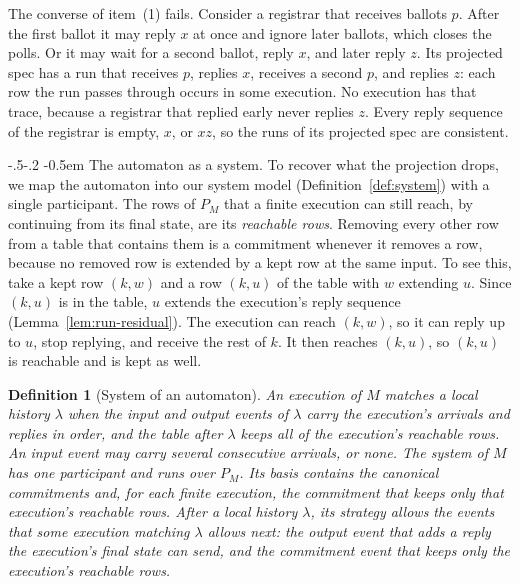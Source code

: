\documentclass[sigconf]{cidr-2027}
\makeatletter
\newtheorem{definition}{Definition}
\theoremstyle{remark}
\renewcommand\paragraph{\@startsection{paragraph}{4}{\z@}%
  {-.5\baselineskip \@plus -2\p@ \@minus -.2\p@}%
  {-0.5em}%
  {\normalfont\bfseries}}
\newcommand{\commitment}{commitment\xspace}
\newcommand{\commitments}{commitments\xspace}
\newcommand{\outrelpast}{extended\xspace}     %
\makeatother
\begin{document}
The converse of item~(1) fails. Consider a registrar that receives ballots
$p$. After the first ballot it may reply $x$ at once and ignore later
ballots, which closes the polls. Or it may wait for a second ballot, reply
$x$, and later reply $z$. Its projected spec has a run that receives $p$,
replies $x$, receives a second $p$, and replies $z$: each row the run passes
through occurs in some execution. No execution has that trace, because a
registrar that replied early never replies $z$. Every reply sequence of the
registrar is empty, $x$, or $xz$, so the runs of its projected spec are
consistent.

\paragraph{The automaton as a system.}
To recover what the projection drops, we map the automaton into our system
model (Definition~\ref{def:system}) with a single participant. The rows of
$P_M$ that a finite execution can still reach, by continuing from its final
state, are its \emph{reachable rows}. Removing every other row from a table
that contains them is a \commitment whenever it removes a row, because no
removed row is \outrelpast by a kept row at the same input. To see this, take
a kept row $(k,w)$ and a row $(k,u)$ of the table with $w$ extending $u$. Since $(k,u)$ is in the table, $u$ extends the execution's reply sequence
(Lemma~\ref{lem:run-residual}). The execution can reach $(k,w)$, so it can
reply up to $u$, stop replying, and receive the rest of $k$. It then reaches
$(k,u)$, so $(k,u)$ is reachable and is kept as well.

\begin{definition}[System of an automaton]
\label{def:automaton-system}
An execution of $M$ \emph{matches} a local history $\lambda$ when the input
and output events of $\lambda$ carry the execution's arrivals and replies in
order, and the table after $\lambda$ keeps all of the execution's reachable
rows. An input event may carry several consecutive arrivals, or none. The
\emph{system of} $M$ has one participant and runs over $P_M$. Its basis
contains the canonical \commitments and, for each finite execution, the
\commitment that keeps only that execution's reachable rows. After a local
history $\lambda$, its strategy allows the events that some execution matching
$\lambda$ allows next: the output event that adds a reply the execution's
final state can send, and the \commitment event that keeps only the
execution's reachable rows.
\end{definition}
\end{document}
